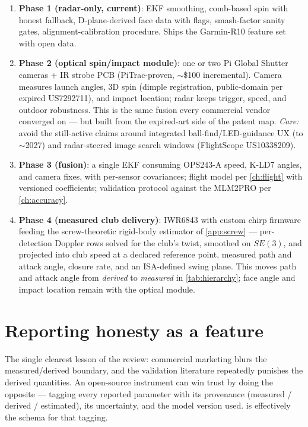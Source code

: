 \begin{enumerate}
\item \textbf{Phase 1 (radar-only, current)}: EKF smoothing, comb-based
spin with honest fallback, D-plane-derived face data with flags,
smash-factor sanity gates, alignment-calibration procedure. Ships the
Garmin-R10 feature set with open data.
\item \textbf{Phase 2 (optical spin/impact module)}: one or two Pi
Global Shutter cameras + IR strobe PCB (PiTrac-proven, $\sim$\$100
incremental). Camera measures launch angles, 3D spin (dimple
registration, public-domain per expired US7292711), and impact location;
radar keeps trigger, speed, and outdoor robustness. This is the same
fusion every commercial vendor converged on --- but built from the
expired-art side of the patent map. \emph{Care:} avoid the still-active
claims around integrated ball-find/LED-guidance UX (to $\sim$2027) and
radar-steered image search windows (FlightScope US10338209).
\item \textbf{Phase 3 (fusion)}: a single EKF consuming OPS243-A speed,
K-LD7 angles, and camera fixes, with per-sensor covariances; flight
model per \cref{ch:flight} with versioned coefficients; validation
protocol against the MLM2PRO per \cref{ch:accuracy}.
\item \textbf{Phase 4 (measured club delivery)}: IWR6843 with custom
chirp firmware feeding the screw-theoretic rigid-body estimator of
\cref{app:screw} --- per-detection Doppler rows solved for the club's
twist, smoothed on $SE(3)$, and projected into club speed at a declared
reference point, measured path and attack angle, closure rate, and an
ISA-defined swing plane. This moves path and attack angle from
\emph{derived} to \emph{measured} in \cref{tab:hierarchy}; face angle
and impact location remain with the optical module.
\end{enumerate}

\section{Reporting honesty as a feature}

The single clearest lesson of the review: commercial marketing blurs the
measured/derived boundary, and the validation literature repeatedly
punishes the derived quantities. An open-source instrument can win trust
by doing the opposite --- tagging every reported parameter with its
provenance (measured / derived / estimated), its uncertainty, and the
model version used.  is effectively the schema for
that tagging.

